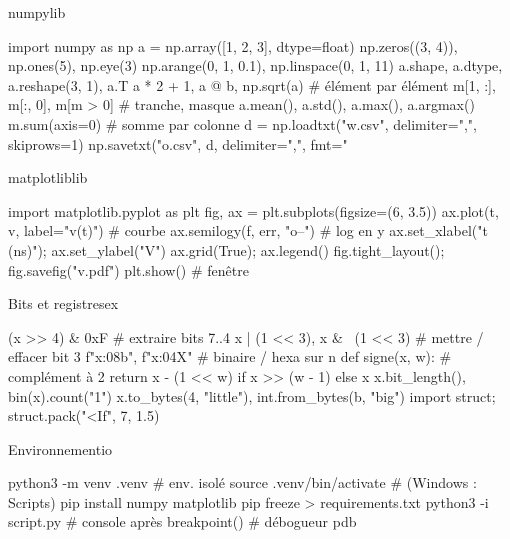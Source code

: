 \documentclass{article}
\begin{document}
\begin{colonne}
\begin{bloc}{numpy}{lib}
\begin{code}
import numpy as np
a = np.array([1, 2, 3], dtype=float)
np.zeros((3, 4)), np.ones(5), np.eye(3)
np.arange(0, 1, 0.1), np.linspace(0, 1, 11)
a.shape, a.dtype, a.reshape(3, 1), a.T
a * 2 + 1, a @ b, np.sqrt(a)  # élément par élément
m[1, :], m[:, 0], m[m > 0]    # tranche, masque
a.mean(), a.std(), a.max(), a.argmax()
m.sum(axis=0)                 # somme par colonne
d = np.loadtxt("w.csv", delimiter=",", skiprows=1)
np.savetxt("o.csv", d, delimiter=",", fmt="%
\end{code}
\end{bloc}

\begin{bloc}{matplotlib}{lib}
\begin{code}
import matplotlib.pyplot as plt
fig, ax = plt.subplots(figsize=(6, 3.5))
ax.plot(t, v, label="v(t)")  # courbe
ax.semilogy(f, err, "o--")   # log en y
ax.set_xlabel("t (ns)"); ax.set_ylabel("V")
ax.grid(True); ax.legend()
fig.tight_layout(); fig.savefig("v.pdf")
plt.show()                   # fenêtre
\end{code}
\end{bloc}

\begin{bloc}{Bits et registres}{ex}
\begin{code}
(x >> 4) & 0xF               # extraire bits 7..4
x | (1 << 3), x & ~(1 << 3)  # mettre / effacer bit 3
f"{x:08b}", f"{x:04X}"       # binaire / hexa sur n
def signe(x, w):             # complément à 2
    return x - (1 << w) if x >> (w - 1) else x
x.bit_length(), bin(x).count("1")
x.to_bytes(4, "little"), int.from_bytes(b, "big")
import struct; struct.pack("<If", 7, 1.5)
\end{code}
\end{bloc}

\begin{bloc}{Environnement}{io}
\begin{code}
python3 -m venv .venv      # env. isolé
source .venv/bin/activate  # (Windows : Scripts)
pip install numpy matplotlib
pip freeze > requirements.txt
python3 -i script.py       # console après
breakpoint()               # débogueur pdb
\end{code}
\end{bloc}


\end{colonne}
\end{document}
